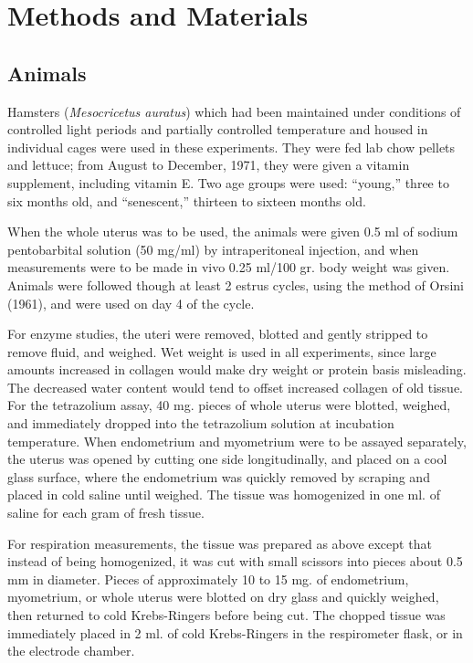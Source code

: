 \chapter{Methods and Materials}

\section{Animals}

Hamsters (\textit{Mesocricetus auratus}) which had been maintained under conditions of controlled light periods and partially controlled temperature and housed in individual cages were used in these
experiments. They were fed lab chow pellets and lettuce; from August to December, 1971, they were given a vitamin supplement, including vitamin E. Two age groups were used: ``young,'' three to six months
old, and ``senescent,'' thirteen to sixteen months old.

When the whole uterus was to be used, the animals were given 0.5 ml of sodium pentobarbital solution (50 mg/ml) by intraperitoneal injection, and when measurements were to be made in vivo 0.25 ml/100 gr. body
weight was given. Animals were followed though at least 2 estrus cycles, using the method of Orsini (1961), and were used on day 4 of the cycle.

For enzyme studies, the uteri were removed, blotted and gently stripped to remove fluid, and weighed. Wet weight is used in all experiments, since large amounts increased in collagen would make dry weight or protein
basis misleading. The decreased water content would tend to offset increased collagen of old tissue. For the tetrazolium assay, 40 mg. pieces of whole uterus were blotted, weighed, and immediately dropped into the tetrazolium
solution at incubation temperature. When endometrium and myometrium were to be assayed separately, the uterus was opened by cutting one side longitudinally, and placed on a cool glass surface, where the endometrium was
quickly removed by scraping and placed in cold saline until weighed. The tissue was homogenized in one ml. of saline for each gram of fresh tissue.

For respiration measurements, the tissue was prepared as above except that instead of being homogenized, it was cut with small scissors into pieces about 0.5 mm in diameter. Pieces of approximately
10 to 15 mg. of endometrium, myometrium, or whole uterus were blotted on dry glass and quickly weighed, then returned to cold Krebs-Ringers before being cut. The chopped tissue was immediately placed in 2 ml. of
cold Krebs-Ringers in the respirometer flask, or in the electrode chamber.

